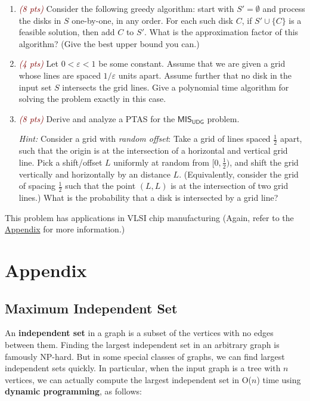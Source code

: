 \documentclass{article}
\begin{document}
    \begin{enumerate}
       \item \textcolor{Maroon}{\textit{(8 pts)}} Consider the following greedy algorithm: start with \( S' = \emptyset \) and process the disks in \( S \) one-by-one, in any order. For each such disk \( C \), if \( S' \cup \{C\} \) is a feasible solution, then add \( C \) to \( S' \). What is the approximation factor of this algorithm? (Give the best upper bound you can.)
        
       \item \textcolor{Maroon}{\textit{(4 pts)}} Let \( 0 < \varepsilon < 1 \) be some constant. Assume that we are given a grid whose lines are spaced \( 1/\varepsilon \) units apart. Assume further that no disk in the input set \( S \) intersects the grid lines. Give a polynomial time algorithm for solving the problem exactly in this case.
        
       \item \textcolor{Maroon}{\textit{(8 pts)}} Derive and analyze a PTAS for the $\textsf{MIS}_{\textsf{UDG}}$ problem.

       \vspace{2mm}
        \textit{Hint:} Consider a grid with \textit{random offset}: Take a grid of lines spaced \( \frac{1}{2} \) apart, such that the origin is at the intersection of a horizontal and vertical grid line. Pick a shift/offset \( L \) uniformly at random from \( [0, \frac{1}{2}) \), and shift the grid vertically and horizontally by an distance \( L \). (Equivalently, consider the grid of spacing \( \frac{1}{2} \) such that the point \( (L, L) \) is at the intersection of two grid lines.) What is the probability that a disk is intersected by a grid line? 
    \end{enumerate}
    This problem has applications in VLSI chip manufacturing (Again, refer to the \hyperref[sec:appendix]{Appendix} for more information.)


\pagebreak

\section*{Appendix}\label{sec:appendix}

    \subsection*{Maximum Independent Set}
        An \textbf{independent set} in a graph is a subset of the vertices with no edges between them. Finding the largest independent set in an arbitrary graph is famously \textsf{NP-hard}. But in some special classes of graphs, we can find largest independent sets quickly. In particular, when the input graph is a tree with $n$ vertices, we can actually compute the largest independent set in O($n$) time using \textbf{dynamic programming}, as follows:
\end{document}
